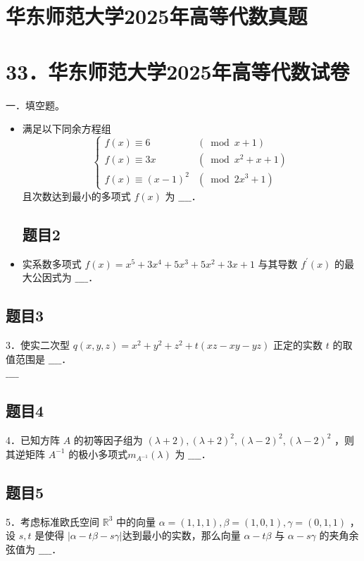 \documentclass{article}
\begin{document}
\section*{华东师范大学2025年高等代数真题}
\section*{33．华东师范大学2025年高等代数试卷}
一．填空题。

\begin{itemize}

\subsection{题目1}
  \item[1．] 满足以下同余方程组
\[
\begin{cases}f(x) \equiv 6 & (\bmod x+1) \\ f(x) \equiv 3 x & \left(\bmod x^{2}+x+1\right) \\ f(x) \equiv(x-1)^{2} & \left(\bmod 2 x^{3}+1\right)\end{cases}
\]
且次数达到最小的多项式 \(f(x)\) 为 \(\_\_\_\_\)．

\subsection{题目2}
  \item[2．] 实系数多项式 \(f(x)=x^{5}+3 x^{4}+5 x^{3}+5 x^{2}+3 x+1\) 与其导数 \(f^{\prime}(x)\) 的最大公因式为 \(\_\_\_\_\)．
\end{itemize}

\subsection{题目3}
3．使实二次型 \(q(x, y, z)=x^{2}+y^{2}+z^{2}+t(x z-x y-y z)\) 正定的实数 \(t\) 的取值范围是 \(\_\_\_\_\)．\\
\(\_\_\_\_\)

\subsection{题目4}
4．已知方阵 \(A\) 的初等因子组为 \((\lambda+2),(\lambda+2)^{2},(\lambda-2)^{2},(\lambda-2)^{2}\) ，则其逆矩阵 \(A^{-1}\) 的极小多项式\(m_{A^{-1}}(\lambda)\) 为 \(\_\_\_\_\)．

\subsection{题目5}
5．考虑标准欧氏空间 \(\mathbb{R}^{3}\) 中的向量 \(\alpha=(1,1,1), \beta=(1,0,1), \gamma=(0,1,1)\) ，设 \(s, t\) 是使得 \(|\alpha-t \beta-s \gamma|\)达到最小的实数，那么向量 \(\alpha-t \beta\) 与 \(\alpha-s \gamma\) 的夹角余弦值为 \(\_\_\_\_\)．
\end{document}
